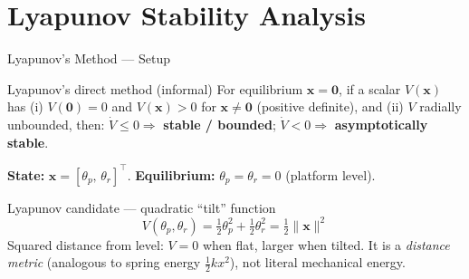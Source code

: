 \documentclass[10pt]{beamer}
\begin{document}
\section{Lyapunov Stability Analysis}
 
\begin{frame}{Lyapunov's Method — Setup}
  \begin{block}{Lyapunov's direct method (informal)}
    For equilibrium $\mathbf{x}=\mathbf{0}$, if a scalar $V(\mathbf{x})$ has
    (i) $V(\mathbf{0}){=}0$ and $V(\mathbf{x}){>}0$ for $\mathbf{x}{\ne}\mathbf{0}$
    (positive definite), and (ii) $V$ radially unbounded, then:
    $\dot V\le 0 \Rightarrow$ \textbf{stable / bounded};\;
    $\dot V<0 \Rightarrow$ \textbf{asymptotically stable}.
  \end{block}
 
  \vspace{0.2em}
  \textbf{State:} $\mathbf{x}=[\theta_p,\,\theta_r]^\top$. \quad
  \textbf{Equilibrium:} $\theta_p=\theta_r=0$ (platform level).
 
  \vspace{0.2em}
  \begin{exampleblock}{Lyapunov candidate — quadratic ``tilt'' function}
    \[
      V(\theta_p,\theta_r)=\tfrac12\theta_p^2+\tfrac12\theta_r^2=\tfrac12\|\mathbf{x}\|^2
    \]
    Squared distance from level: $V{=}0$ when flat, larger when tilted. It is a
    \emph{distance metric} (analogous to spring energy $\tfrac12kx^2$), not literal
    mechanical energy.
  \end{exampleblock}
\end{frame}
 
\end{document}
